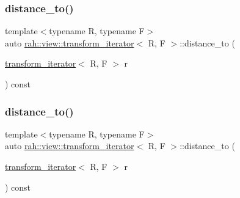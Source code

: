 \subsubsection{\texorpdfstring{distance\_to()}{distance\_to()}\hspace{0.1cm}{\footnotesize\ttfamily [1/2]}}
{\footnotesize\ttfamily template$<$typename R, typename F$>$ \\
auto \mbox{\hyperlink{structrah_1_1view_1_1transform__iterator}{rah\+::view\+::transform\+\_\+iterator}}$<$ R, F $>$\+::distance\+\_\+to (\begin{DoxyParamCaption}\item[{\mbox{\hyperlink{structrah_1_1view_1_1transform__iterator}{transform\+\_\+iterator}}$<$ R, F $>$}]{r }\end{DoxyParamCaption}) const\hspace{0.3cm}{\ttfamily [inline]}}

\mbox{\label{structrah_1_1view_1_1transform__iterator_ae0919c95985ebca42017346da790c981}} 
\subsubsection{\texorpdfstring{distance\_to()}{distance\_to()}\hspace{0.1cm}{\footnotesize\ttfamily [2/2]}}
{\footnotesize\ttfamily template$<$typename R, typename F$>$ \\
auto \mbox{\hyperlink{structrah_1_1view_1_1transform__iterator}{rah\+::view\+::transform\+\_\+iterator}}$<$ R, F $>$\+::distance\+\_\+to (\begin{DoxyParamCaption}\item[{\mbox{\hyperlink{structrah_1_1view_1_1transform__iterator}{transform\+\_\+iterator}}$<$ R, F $>$}]{r }\end{DoxyParamCaption}) const\hspace{0.3cm}{\ttfamily [inline]}}

\mbox{\label{structrah_1_1view_1_1transform__iterator_a68105373ae5ce99863589e17605f3833}} 
